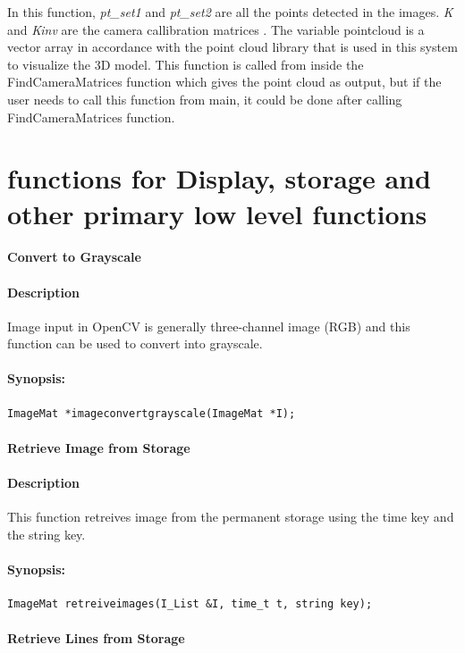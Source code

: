  In this function, \textit{pt\_set1} and \textit{pt\_set2} are all the points detected in the images. \textit{K} and \textit{Kinv} are the camera callibration matrices . The variable pointcloud is a vector array in accordance with the point cloud library that is used in this system to visualize the 3D model. This function is called from inside the FindCameraMatrices function which gives the point cloud as output, but if the user needs to call this function from main,  it could be  done after calling FindCameraMatrices function. 

\section{functions for Display, storage and other primary low level functions}
\paragraph{Convert to Grayscale}
\paragraph{Description}
Image input in OpenCV is generally three-channel image (RGB) and this function can be used to convert into grayscale.
\paragraph{Synopsis:}
\begin{lstlisting}
ImageMat *imageconvertgrayscale(ImageMat *I);
\end{lstlisting}


\paragraph{ Retrieve Image from Storage}
\paragraph{Description}
This function retreives image from the permanent storage using the time key and the string key. 
\paragraph{Synopsis:}
\begin{lstlisting}
ImageMat retreiveimages(I_List &I, time_t t, string key);
\end{lstlisting}

\paragraph{ Retrieve Lines from Storage}
